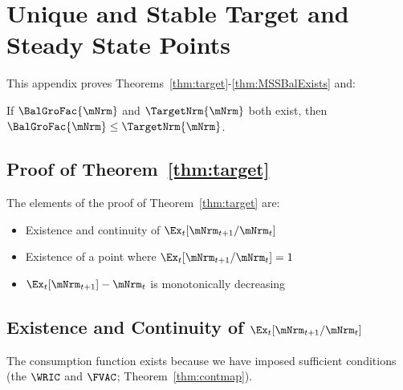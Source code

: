 \documentclass[\econtexRoot/BufferStockTheory]{subfiles}
\begin{document}

\hypertarget{ApndxMTargetIsStable}{}
\section{Unique and Stable Target and Steady State Points}\label{sec:ApndxMTargetIsStable}


This appendix proves Theorems~\ref{thm:target}-\ref{thm:MSSBalExists} and:
\onlyinsubfile{\setcounter{theorem}{1}}

  \begin{lemma}\label{lemma:orderingPartOne}
  If $\BalGroFac{\mNrm}$ and $\TargetNrm{\mNrm}$ both exist, then $\BalGroFac{\mNrm} \leq \TargetNrm{\mNrm}$.
  \end{lemma}

  \begin{comment}
  \begin{lemma}\label{lemma:orderingPartTwo}
  If $\BalGroFac{\mNrm}$ and $\BalGroRte{\mNrm}$ both exist, then $\BalGroFac{\mNrm} \leq \BalGroRte{\mNrm}$.
  \end{lemma}
\end{comment}

  \subsection{Proof of Theorem~\ref{thm:target}}

  
  The elements of the proof of Theorem~\ref{thm:target} are:
\begin{itemize}
\item Existence and continuity of $\Ex_t [{\mNrm}_{t+1}/\mNrm_t]$
\item Existence of a point where $\Ex_t [{\mNrm}_{t+1}/\mNrm_t] = 1$
\item $\Ex_t [{\mNrm}_{t+1}]-\mNrm_{t}$ is monotonically decreasing
\end{itemize}


\subsection{Existence and Continuity of
  \texorpdfstring{$\Ex_t [{\mNrm}_{t+1}/\mNrm_t]$}{Ex-{t}[mNrm-{t+1}/mNrm-{t}]}}\label{subsubsec:RatExitsCont}
The consumption function exists because we have imposed sufficient conditions (the $\WRIC$ and $\FVAC$; Theorem~\ref{thm:contmap}). %
\end{document}
